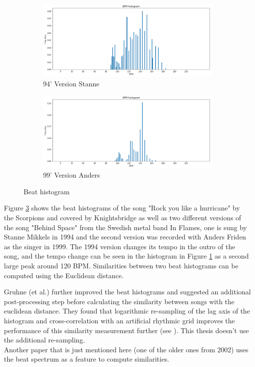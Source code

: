 \begin{figure}[htbp]
{{			\begin{subfigure}{.495\textwidth}
				\centering
				\includegraphics[scale=0.25]{Images/Beat/s_s_bh.png}
				\caption{94' Version Stanne}
				\label{ssbh}
			\end{subfigure}%
			\begin{subfigure}{.495\textwidth}
				\centering
				\includegraphics[scale=0.25]{Images/Beat/s_a_bh.png}
				\caption{99' Version Anders}
				\label{sabh}
			\end{subfigure}%
	}}
	\caption{Beat histogram}
	\label{fig:bh1}
\end{figure}
\FloatBarrier

\noindent Figure \ref{fig:bh1} shows the beat histograms of the song "Rock you like a hurricane" by the Scorpions and covered by Knightsbridge as well as two different versions of the song "Behind Space" from the Swedish metal band In Flames, one is sung by Stanne Mikkels in 1994 and the second version was recorded with Anders Friden as the singer in 1999. The 1994 version changes its tempo in the outro of the song, and the tempo change can be seen in the histogram in Figure \ref{ssbh} as a second large peak around 120 BPM.
Similarities between two beat histograms can be computed using the Euclidean distance. 


\noindent Gruhne (et al.) further improved the beat histograms and suggested an additional post-processing step before calculating the similarity between songs with the euclidean distance. They found that logarithmic re-sampling of the lag axis of the histogram and cross-correlation with an artificial rhythmic grid improves the performance of this similarity measurement further (see \cite[182]{rbh1}). This thesis doesn't use the additional re-sampling.\\
\noindent Another paper that is just mentioned here (one of the older ones from 2002) uses the beat spectrum as a feature \cite{rhythm1} to compute similarities.


